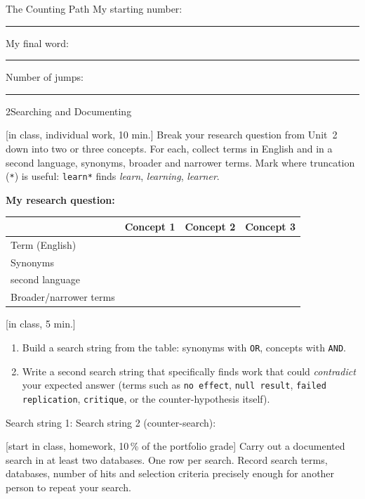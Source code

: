\begin{uebungsblatt}{The Counting Path}
\medskip
\noindent My starting number: \rule{15mm}{0.3pt}\qquad
My final word: \rule{45mm}{0.3pt}\qquad
Number of jumps: \rule{15mm}{0.3pt}
\end{uebungsblatt}

\begin{uebungsblattb}{2}{Searching and Documenting}

[in class, individual work, 10 min.]
Break your research question from Unit~2 down into two or three concepts.
For each, collect terms in English and in a second language, synonyms,
broader and narrower terms. Mark where truncation (\texttt{*}) is useful:
\texttt{learn*} finds \emph{learn}, \emph{learning}, \emph{learner}.

\smallskip
\noindent\textbf{My research question:}
\begin{center}
\renewcommand{\arraystretch}{2.0}
\begin{tabular}{|p{}|p{}|p{}|p{}|}
\hline
 & \textbf{Concept 1} & \textbf{Concept 2} & \textbf{Concept 3} \\ \hline
Term (English) & & & \\ \hline
Synonyms & & & \\ \hline
second language & & & \\ \hline
Broader/narrower terms & & & \\ \hline
\end{tabular}
\end{center}

[in class, 5 min.]
\begin{enumerate}
  \item Build a search string from the table: synonyms with \texttt{OR},
    concepts with \texttt{AND}.
  \item Write a second search string that specifically finds work that
    could \emph{contradict} your expected answer (terms such as
    \texttt{no effect}, \texttt{null result}, \texttt{failed replication},
    \texttt{critique}, or the counter-hypothesis itself).
\end{enumerate}
\noindent Search string 1:
\noindent Search string 2 (counter-search):

[start in class, homework, 10\,\% of the portfolio grade]
Carry out a documented search in at least two databases. One row per
search. Record search terms, databases, number of hits and selection
criteria precisely enough for another person to repeat your search.


\end{uebungsblattb}
